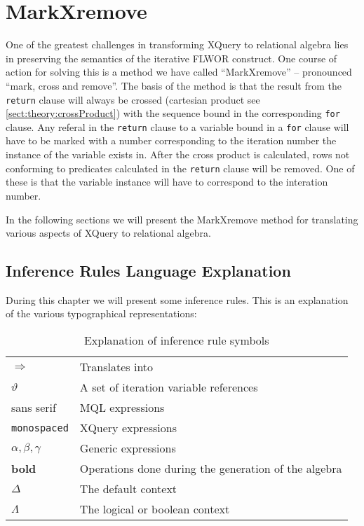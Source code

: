 \section{MarkXremove}
\label{sect:translation:mXr}

One of the greatest challenges in transforming XQuery to relational algebra lies in preserving the semantics of
the iterative FLWOR construct. One course of action for solving this is a method we have called ``MarkXremove'' --
pronounced ``mark, cross and remove''. The basis of the method is that the result from the \texttt{return} clause
will always be crossed (cartesian product see \ref{sect:theory:crossProduct}) with the sequence bound in the
corresponding \texttt{for} clause. Any referal in the \texttt{return} clause to a variable bound in a \texttt{for}
clause will have to be marked with a number corresponding to the iteration number the instance of the variable
exists in. After the cross product is calculated, rows not conforming to predicates calculated in the
\texttt{return} clause will be removed. One of these is that the variable instance will have to correspond to the
interation number.

In the following sections we will present the MarkXremove method for translating various aspects of XQuery to
relational algebra.

\subsection{Inference Rules Language Explanation}
\label{sect:translation:inferenceExplanation}
During this chapter we will present some inference rules. This is an explanation
of the various typographical representations:

\begin{table}[h]


\begin{tabular}{l|l}

  $\Longrightarrow$  & Translates into \\
  $\vartheta$ & A set of iteration variable references \\
  \textsf{sans serif} & MQL expressions \\
  \texttt{monospaced} & XQuery expressions \\
  $\alpha , \beta, \gamma$ & Generic expressions \\
  \textbf{bold} & Operations done during the generation of the algebra \\
  $\Delta$ & The default context \\
  $\Lambda$ & The logical or boolean context \\
  
\end{tabular}
\caption{Explanation of inference rule symbols}
\label{tab:translation:inferenceRuleSymbols}
\end{table}


